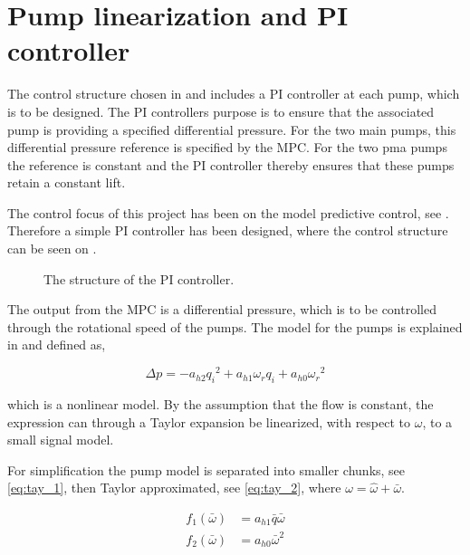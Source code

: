 \chapter{Pump linearization and PI controller}
\label{cha:linear_pump}

The control structure chosen in  and  includes a PI controller at each pump, which is to be designed. The PI controllers purpose is to ensure that the associated pump is providing a specified differential pressure. For the two main pumps, this differential pressure reference is specified by the MPC. For the two pma pumps the reference is constant and the PI controller thereby ensures that these pumps retain a constant lift. 

The control focus of this project has been on the model predictive control, see . Therefore a simple PI controller has been designed, where the control structure can be seen on .

\begin{figure}[H]
\centering
  
\caption{The structure of the PI controller.}
\label{fig:simple_PI}
\end{figure}

The output from the MPC is a differential pressure, which is to be controlled through the rotational speed of the pumps. The model for the pumps is explained in  and defined as,

\begin{equation*}
\Delta p = -a_{h2}{q_i}^2 + a_{h1} \omega_r q_i + a_{h0}{\omega_r}^2
\end{equation*}

which is a nonlinear model. By the assumption that the flow is constant, the expression can through a Taylor expansion be linearized, with respect to $\omega$, to a small signal model.


For simplification the pump model is separated into smaller chunks, see \eqref{eq:tay_1}, then Taylor approximated, see \eqref{eq:tay_2}, where $\omega = \hat{\omega}+\bar{\omega}$.

\begin{equation}
\begin{split}
f_1(\bar{\omega}) &= a_{h1}\bar{q}\bar{\omega} \\
f_2(\bar{\omega}) &= a_{h0}\bar{\omega}^2
\end{split}
\label{eq:tay_1}
\end{equation}


